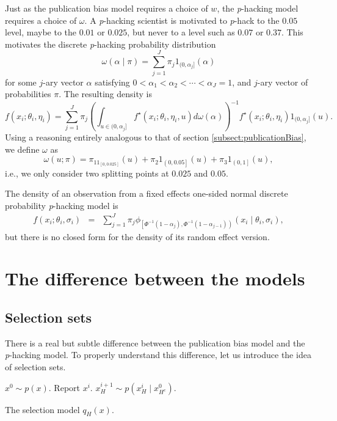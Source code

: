 \documentclass{article}
\theoremstyle{plain}
\theoremstyle{definition}
\begin{document}
Just as the publication bias model requires a choice of $w$, the \textit{p}-hacking model requires a choice of $\omega$. A \textit{p}-hacking scientist is motivated to \textit{p}-hack to the $0.05$ level, maybe to the $0.01$ or $0.025$, but never to a level such as $0.07$ or $0.37$. This motivates the discrete \textit{p}-hacking probability distribution
$$\omega\left(\alpha\mid\pi\right)=\sum_{j=1}^{J}\pi_{j}1_{(0,\alpha_{j}]}\left(\alpha\right)$$
for some $j$-ary vector $\alpha$ satisfying $0<\alpha_{1}<\alpha_{2}<\cdots<\alpha_{J}=1$,
and $j$-ary vector of probabilities $\pi$. The resulting density is 
\[
f\left(x_{i};\theta_{i},\eta_{i}\right)=\sum_{j=1}^{J}\pi_{j}\left(\int_{u\in(0,\alpha_{j}]}f^\star\left(x_{i};\theta_{i},\eta_{i}, u\right)d\omega(\alpha)\right)^{-1}f^\star\left(x_{i};\theta_{i},\eta_{i}\right)1_{(0,\alpha_{j}]}\left(u\right).
\]
Using a reasoning entirely analogous to that of section \ref{subsect:publicationBias}, we define $\omega$ as
\[
\omega\left(u;\pi\right) = \pi_11_{\left[0,0.025\right]}\left(u\right) + \pi_{2}1_{\left(0,0.05\right]}\left(u\right) + \pi_{3}1_{\left(0,1\right]}\left(u\right),
\]
i.e., we only consider two splitting points at $0.025$ and $0.05$.

The density of an observation from a fixed effects one-sided normal discrete probability \textit{p}-hacking model is
\begin{eqnarray}
f\left(x_{i};\theta_{i},\sigma_{i}\right) & = & \sum_{j=1}^{J}\pi_{j}\phi_{\left[\Phi^{-1}\left(1-\alpha_{j}\right),\Phi^{-1}\left(1-\alpha_{j-1}\right)\right)}\left(x_{i}\mid\theta_{i},\sigma_{i}\right),\label{eq:Fixed effects, p-hacking}
\end{eqnarray}
but there is no closed form for the density of its random effect version.

\section{The difference between the models}\label{sect:differences}

\subsection{Selection sets\label{sec:Selection Sets}}
There is a real but subtle difference between the publication bias model and the \textit{p}-hacking model. To properly understand this difference, let us introduce the idea of selection sets.

\begin{algorithm}[!h]
\begin{algorithmic}[1]
	\State $x^{0}\sim p\left(x\right)$.
			\State Report $x^i$.           
		\Else         
			\State $x_{H}^{i+1}\sim p\left(x_{H}^{i}\mid x_{H^{c}}^{0}\right)$.        
		\EndIf  
	\EndFor  
\end{algorithmic}
\caption{\label{alg:Selection model}The selection model $q_{H}\left(x\right)$.}
\end{algorithm}
\end{document}
